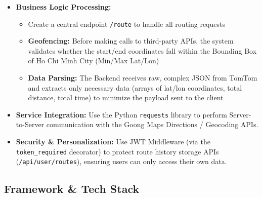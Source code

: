 \begin{itemize}
    \item \textbf{Business Logic Processing:}
    \begin{itemize}
        \item Create a central endpoint \texttt{/route} to handle all routing requests
        \item \textbf{Geofencing:} Before making calls to third-party APIs, the system validates whether the start/end coordinates fall within the Bounding Box of Ho Chi Minh City (Min/Max Lat/Lon)
        \item \textbf{Data Parsing:} The Backend receives raw, complex JSON from TomTom and extracts only necessary data (arrays of lat/lon coordinates, total distance, total time) to minimize the payload sent to the client
    \end{itemize}
    
    \item \textbf{Service Integration:} Use the Python \texttt{requests} library to perform Server-to-Server communication with the Goong Maps Directions / Geocoding APIs.
    
    \item \textbf{Security \& Personalization:} Use JWT Middleware (via the \texttt{token\_required} decorator) to protect route history storage APIs (\texttt{/api/user/routes}), ensuring users can only access their own data.
\end{itemize}

\subsection{Framework \& Tech Stack}

